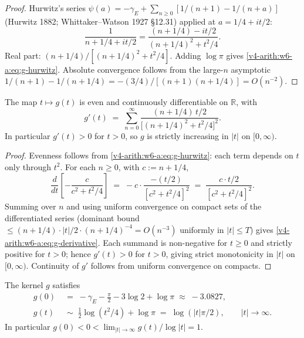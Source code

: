 \begin{proof}
Hurwitz's series
\(\psi(a)=-\gamma_{E}+\sum_{n\geq 0}[1/(n+1)-1/(n+a)]\) (Hurwitz 1882;
Whittaker--Watson 1927 \S12.31) applied at \(a=1/4+it/2\):
\[
\frac{1}{n+1/4+it/2}=\frac{(n+1/4)-it/2}{(n+1/4)^{2}+t^{2}/4}.
\]
Real part: \((n+1/4)/[(n+1/4)^{2}+t^{2}/4]\). Adding \(\log\pi\) gives
\eqref{v4-arith:w6-a:eq:g-hurwitz}. Absolute convergence follows from
the large-\(n\) asymptotic
\(1/(n+1)-1/(n+1/4)=-(3/4)/[(n+1)(n+1/4)]=O(n^{-2})\).
\end{proof}

\begin{lemma}
\label{v4-arith:w6-a:lem:g-monotone}
The map \(t\mapsto g(t)\) is even and
continuously differentiable on \(\mathbb{R}\), with
\begin{equation}
\label{v4-arith:w6-a:eq:g-derivative}
g'(t)\;=\;\sum_{n=0}^{\infty}\frac{(n+1/4)\,t/2}{\bigl[(n+1/4)^{2}+t^{2}/4\bigr]^{2}}.
\end{equation}
In particular \(g'(t)>0\) for \(t>0\), so \(g\) is strictly increasing in
\(|t|\) on \([0,\infty)\).
\end{lemma}

\begin{proof}
Evenness follows from \eqref{v4-arith:w6-a:eq:g-hurwitz}: each term
depends on \(t\) only through \(t^{2}\). For each \(n\geq 0\), with
\(c:=n+1/4\),
\[
\frac{d}{dt}\!\left[-\frac{c}{c^{2}+t^{2}/4}\right]
\;=\;-c\cdot\frac{-(t/2)}{[c^{2}+t^{2}/4]^{2}}
\;=\;\frac{c\cdot t/2}{[c^{2}+t^{2}/4]^{2}}.
\]
Summing over \(n\) and using uniform convergence on compact sets of
the differentiated series
(dominant bound \(\leq(n+1/4)\cdot|t|/2\cdot(n+1/4)^{-4}=O(n^{-3})\)
uniformly in \(|t|\leq T\)) gives
\eqref{v4-arith:w6-a:eq:g-derivative}. Each summand is non-negative
for \(t\geq 0\) and strictly positive for \(t>0\); hence \(g'(t)>0\) for
\(t>0\), giving strict monotonicity in \(|t|\) on \([0,\infty)\).
Continuity of \(g'\) follows from uniform convergence on compacts.
\end{proof}

\begin{proposition}
\label{v4-arith:w6-a:prop:g-boundary}
The kernel \(g\) satisfies
\begin{align}
\label{v4-arith:w6-a:eq:g-at-zero}
g(0)&\;=\;-\gamma_{E}-\frac{\pi}{2}-3\log 2+\log\pi\;\approx\;-3.0827,\\
\label{v4-arith:w6-a:eq:g-at-infinity}
g(t)&\;\sim\;\tfrac{1}{2}\log(t^{2}/4)+\log\pi\;=\;\log(|t|\pi/2),\qquad|t|\to\infty.
\end{align}
In particular \(g(0)<0<\lim_{|t|\to\infty}g(t)/\log|t|=1\).
\end{proposition}

